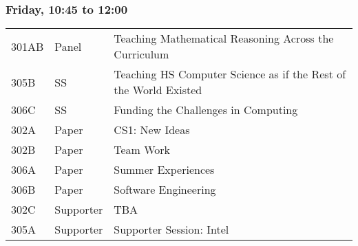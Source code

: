 



\subsubsection*{Friday, 10:45 to 12:00}
\begin{tabular*}{5in}{@{}p{0.5in}@{}p{0.75in}@{}p{3.75in}}

301AB & Panel & Teaching Mathematical Reasoning Across the Curriculum \\

305B & SS & Teaching HS Computer Science as if the Rest of the World Existed \\

306C & SS & Funding the Challenges in Computing \\

302A & Paper & CS1:  New Ideas \\

302B & Paper & Team Work \\

306A & Paper & Summer Experiences \\

306B & Paper & Software Engineering \\

302C & Supporter & TBA \\

305A & Supporter & Supporter Session: Intel 
\end{tabular*}
